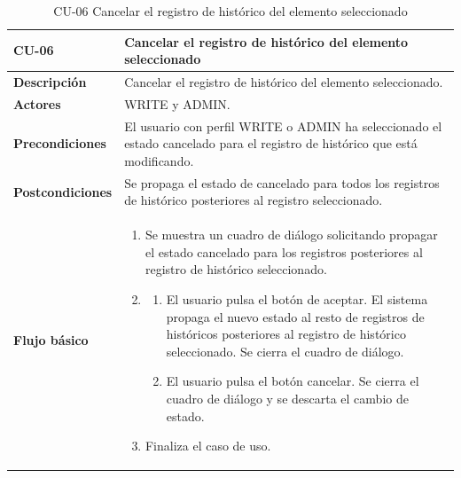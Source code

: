 \begin{table} [H]
    \centering
    \setlength{\leftmargini}{0.4cm}
	\resizebox{14cm}{!} { %
    \begin{tabular}{| m{3cm} | m{11cm} |}   
    \hline
	  \textbf{CU-06} & \textbf{Cancelar el registro de histórico del elemento seleccionado} \\\hline
	  \textbf{Descripción} & Cancelar el registro de histórico del elemento seleccionado. \\\hline
	  \textbf{Actores} & WRITE y ADMIN. \\\hline
	  \textbf{Precondiciones} & El usuario con perfil WRITE o ADMIN ha seleccionado el estado cancelado para el registro de histórico que está modificando. \\\hline
	  \textbf{Postcondiciones} & Se propaga el estado de cancelado para todos los registros de histórico posteriores al registro seleccionado. \\\hline
	  \textbf{Flujo básico} & 
		\begin{enumerate}
	  	\item Se muestra un cuadro de diálogo solicitando propagar el estado cancelado para los registros posteriores al registro de histórico seleccionado.
        \item 
			\begin{enumerate}	
			   \item El usuario pulsa el botón de aceptar. El sistema propaga el nuevo estado al resto de registros de históricos posteriores al registro de histórico seleccionado. Se cierra el cuadro de diálogo.
			   \item El usuario pulsa el botón cancelar. Se cierra el cuadro de diálogo y se descarta el cambio de estado.
			\end{enumerate}
	  \item Finaliza el caso de uso.
	  \end{enumerate} 	  	  
	  \\\hline
    \end{tabular}
    } %
    \caption{CU-06 Cancelar el registro de histórico del elemento seleccionado}
    \label{tab:cu-cancelar-historico-chap-analisis}
\end{table}


